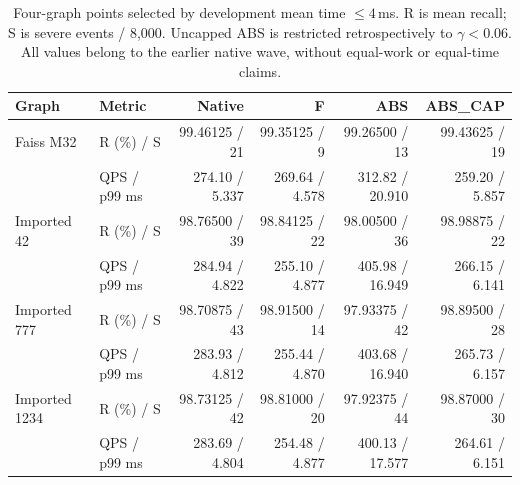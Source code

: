 \begin{table}[t]
\centering
\caption{Four-graph points selected by development mean time $\leq4$\,ms. R is mean recall; S is severe events / 8,000. Uncapped ABS is restricted retrospectively to $\gamma<0.06$. All values belong to the earlier native wave, without equal-work or equal-time claims.}
\label{tab:native}
\small
\begin{tabular}{@{}llrrrr@{}}
\toprule
Graph & Metric & Native & F & ABS & ABS\_CAP \\
\midrule
Faiss M32 & R (\%) / S & 99.46125 / 21 & 99.35125 / 9 & 99.26500 / 13 & 99.43625 / 19 \\
 & QPS / p99 ms & 274.10 / 5.337 & 269.64 / 4.578 & 312.82 / 20.910 & 259.20 / 5.857 \\
Imported 42 & R (\%) / S & 98.76500 / 39 & 98.84125 / 22 & 98.00500 / 36 & 98.98875 / 22 \\
 & QPS / p99 ms & 284.94 / 4.822 & 255.10 / 4.877 & 405.98 / 16.949 & 266.15 / 6.141 \\
Imported 777 & R (\%) / S & 98.70875 / 43 & 98.91500 / 14 & 97.93375 / 42 & 98.89500 / 28 \\
 & QPS / p99 ms & 283.93 / 4.812 & 255.44 / 4.870 & 403.68 / 16.940 & 265.73 / 6.157 \\
Imported 1234 & R (\%) / S & 98.73125 / 42 & 98.81000 / 20 & 97.92375 / 44 & 98.87000 / 30 \\
 & QPS / p99 ms & 283.69 / 4.804 & 254.48 / 4.877 & 400.13 / 17.577 & 264.61 / 6.151 \\
\bottomrule
\end{tabular}
\end{table}
